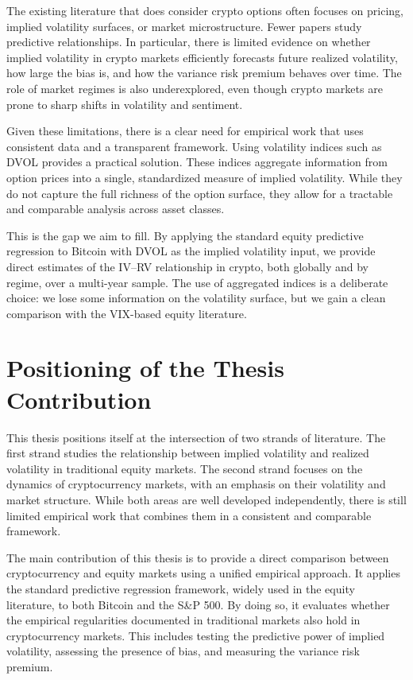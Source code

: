 \documentclass[11pt,a4paper,openany]{report}
\begin{document}
The existing literature that does consider crypto options often focuses
on pricing, implied volatility surfaces, or market microstructure. Fewer
papers study predictive relationships. In particular, there is limited
evidence on whether implied volatility in crypto markets efficiently
forecasts future realized volatility, how large the bias is, and how the
variance risk premium behaves over time. The role of market regimes is
also underexplored, even though crypto markets are prone to sharp shifts
in volatility and sentiment.

Given these limitations, there is a clear need for empirical work that
uses consistent data and a transparent framework. Using volatility
indices such as DVOL provides a practical solution. These indices
aggregate information from option prices into a single, standardized
measure of implied volatility. While they do not capture the full
richness of the option surface, they allow for a tractable and
comparable analysis across asset classes.

This is the gap we aim to fill. By applying the standard equity
predictive regression to Bitcoin with DVOL as the implied volatility
input, we provide direct estimates of the IV--RV relationship in
crypto, both globally and by regime, over a multi-year sample. The
use of aggregated indices is a deliberate choice: we lose some
information on the volatility surface, but we gain a clean comparison
with the VIX-based equity literature.

\section{Positioning of the Thesis
Contribution}\label{positioning-of-the-thesis-contribution}

This thesis positions itself at the intersection of two strands of
literature. The first strand studies the relationship between implied
volatility and realized volatility in traditional equity markets. The
second strand focuses on the dynamics of cryptocurrency markets, with an
emphasis on their volatility and market structure. While both areas are
well developed independently, there is still limited empirical work that
combines them in a consistent and comparable framework.

The main contribution of this thesis is to provide a direct comparison
between cryptocurrency and equity markets using a unified empirical
approach. It applies the standard predictive regression framework,
widely used in the equity literature, to both Bitcoin and the S\&P 500.
By doing so, it evaluates whether the empirical regularities documented
in traditional markets also hold in cryptocurrency markets. This
includes testing the predictive power of implied volatility, assessing
the presence of bias, and measuring the variance risk premium.
\end{document}
